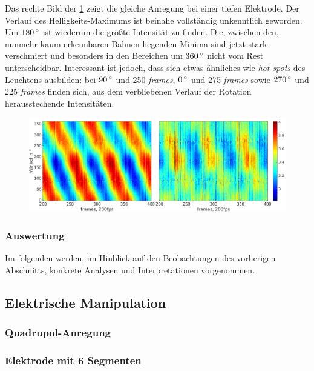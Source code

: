 \documentclass[numbers=noenddot,a4paper]{scrartcl}
\newcommand{\degree}{^\circ}
\newcommand{\tilt}[1]{\textit{#1}}
\begin{document}
			Das rechte Bild der \ref{img:randhochutiefrotat} zeigt die gleiche Anregung bei einer tiefen Elektrode. Der Verlauf des Helligkeits-Maximums ist beinahe vollständig unkenntlich geworden. Um $\unit[180]{\degree}$ ist wiederum die größte Intensität zu finden. Die, zwischen den, nunmehr kaum erkennbaren Bahnen liegenden Minima sind jetzt stark verschmiert und besonders in den Bereichen um $\unit[360]{\degree}$ nicht vom Rest unterscheidbar. Interessant ist jedoch, dass sich etwas ähnliches wie \tilt{hot-spots} des Leuchtens ausbilden: bei $\unit[90]{\degree}$ und 250 \tilt{frames}, $\unit[0]{\degree}$ und 275 \tilt{frames} sowie $\unit[270]{\degree}$ und 225 \tilt{frames} finden sich, aus dem verbliebenen Verlauf der Rotation herausstechende Intensitäten. 

				\begin{figure}[!t]
					\includegraphics[width=\textwidth,height=0.35\textwidth]{figs/auswertung/randrotathochutief3Hz1sekwink.png}
					\caption{}
					\label{img:randhochutiefrotat}
				\end{figure}

			\subsubsection*{Auswertung}

				Im folgenden werden, im Hinblick auf den Beobachtungen des vorherigen Abschnitts, konkrete Analysen und Interpretationen vorgenommen.\\
                

        \subsection{Elektrische Manipulation}

            \subsubsection{Quadrupol-Anregung}

            \subsubsection{Elektrode mit 6 Segmenten}
\end{document}
